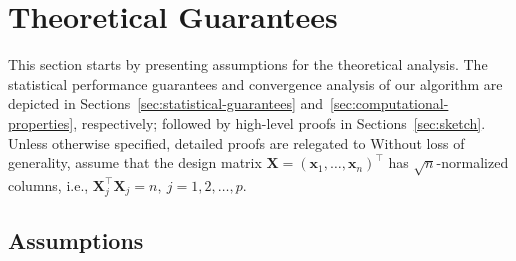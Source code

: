 \section{Theoretical Guarantees}\label{sec:theorical-properties}
This section starts by presenting assumptions for the theoretical analysis.
The statistical performance guarantees and convergence analysis of our algorithm are depicted in Sections~\ref{sec:statistical-guarantees} and~\ref{sec:computational-properties}, respectively;
followed by high-level proofs in Sections~\ref{sec:sketch}.
Unless otherwise specified, detailed proofs are relegated to\fi
Without loss of generality, assume that the design matrix $\mathbf{X} = (\boldsymbol{x}_1,\ldots,\boldsymbol{x}_n)^\top$ has $\sqrt{n}$-normalized columns, i.e., $\mathbf{X}_j^{\top}\mathbf{X}_j=n,\ j=1,2,\ldots,p$.

\subsection{Assumptions}
\label{sec:assumptions}


